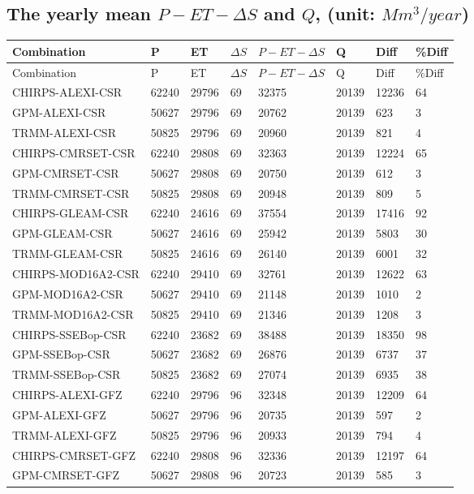 \documentclass[oneside,openany]{article}%
\begin{document}
%
\clearpage%
\cleardoublepage%
\subsection{The yearly mean $P-ET-\Delta S$ and $Q$, (unit: $Mm^3/year$)}%
\label{subsec:TheyearlymeanP{-}ET{-}DeltaSandQ,(unitMm3/year)}%
\begin{longtable}{|l|l|l|l|l|l|l|l|}%
\hline%
\textbf{Combination}&\textbf{P}&\textbf{ET}&\textbf{$\Delta S$}&\textbf{$P-ET-\Delta S$}&\textbf{Q}&\textbf{Diff}&\textbf{\%Diff}\\%
\hline%
\endfirsthead%
\hline%
Combination&P&ET&$\Delta S$&$P-ET-\Delta S$&Q&Diff&\%Diff\\%
\hline%
\endhead%
\hline%
\endfoot%
CHIRPS-ALEXI-CSR&62240&29796&69&32375&20139&12236&64\\%
GPM-ALEXI-CSR&50627&29796&69&20762&20139&623&3\\%
TRMM-ALEXI-CSR&50825&29796&69&20960&20139&821&4\\%
CHIRPS-CMRSET-CSR&62240&29808&69&32363&20139&12224&65\\%
GPM-CMRSET-CSR&50627&29808&69&20750&20139&612&3\\%
TRMM-CMRSET-CSR&50825&29808&69&20948&20139&809&5\\%
CHIRPS-GLEAM-CSR&62240&24616&69&37554&20139&17416&92\\%
GPM-GLEAM-CSR&50627&24616&69&25942&20139&5803&30\\%
TRMM-GLEAM-CSR&50825&24616&69&26140&20139&6001&32\\%
CHIRPS-MOD16A2-CSR&62240&29410&69&32761&20139&12622&63\\%
GPM-MOD16A2-CSR&50627&29410&69&21148&20139&1010&2\\%
TRMM-MOD16A2-CSR&50825&29410&69&21346&20139&1208&3\\%
CHIRPS-SSEBop-CSR&62240&23682&69&38488&20139&18350&98\\%
GPM-SSEBop-CSR&50627&23682&69&26876&20139&6737&37\\%
TRMM-SSEBop-CSR&50825&23682&69&27074&20139&6935&38\\%
CHIRPS-ALEXI-GFZ&62240&29796&96&32348&20139&12209&64\\%
GPM-ALEXI-GFZ&50627&29796&96&20735&20139&597&2\\%
TRMM-ALEXI-GFZ&50825&29796&96&20933&20139&794&4\\%
CHIRPS-CMRSET-GFZ&62240&29808&96&32336&20139&12197&64\\%
GPM-CMRSET-GFZ&50627&29808&96&20723&20139&585&3\\%

\end{longtable}
\end{document}
